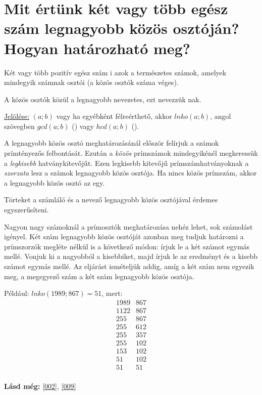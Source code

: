 
\section{Mit értünk két vagy több egész szám legnagyobb közös osztóján?
\texorpdfstring{\\}{}Hogyan határozható meg?}
\label{001}

\begin{defin}
Két vagy több pozitív egész szám i azok a természetes
számok, amelyek mindegyik számnak osztói (a közös osztók száma véges).
\end{defin}

\begin{defin}
A közös osztók közül a legnagyobb nevezetes, ezt nevezzük nak.

\uline{Jelölése:} $(a; b)$ vagy ha egyébként félreérthető, akkor $lnko(a; b)$,
angol szövegben $gcd(a; b)$ () vagy $hcd(a;
b)$ ().
\end{defin}

\begin{method}
A legnagyobb közös osztó meghatározásánál először felírjuk a számok
prímtényezős felbontását. Ezután a \emph{közös} prímszámok mindegyikénél
megkeressük a \emph{legkisebb} hatványkitevőjűt. Ezen legkisebb kitevőjű
prímszámhatványoknak a \emph{szorzata} lesz a számok legnagyobb közös osztója.
Ha nincs közös prímszám, akkor a legnagyobb közös osztó az egy.
\end{method}

\begin{note2}
Törteket a számláló és a nevező legnagyobb közös osztójával érdemes
egyszerűsíteni.
\end{note2}

\begin{method4}
Nagyon nagy számoknál a prímosztók meghatározása nehéz lehet, sok számolást
igényel. Két szám legnagyobb közös osztóját azonban meg tudjuk határozni a
prímszorzók megléte nélkül is a következő módon: írjuk le a két számot egymás
mellé. Vonjuk ki a nagyobból a kisebbiket, majd írjuk le az eredményt és a
kisebb számot egymás mellé. Az eljárást ismételjük addig, amíg a két szám nem
egyezik meg, a megegyező szám a két szám legnagyobb közös osztója.

Például: $lnko(1989; 867) = 51$, mert:
\[
\begin{array}{r|l}
  1989 & 867 \\
  1122 & 867 \\
  255 & 867 \\
  255 & 612 \\
  255 & 357 \\
  255 & 102 \\
  153 & 102 \\
  51 & 102 \\
  51 & 51 \\
\end{array}
\]
\end{method4}

\textbf{Lásd még:} \ref{002}, \ref{009}
